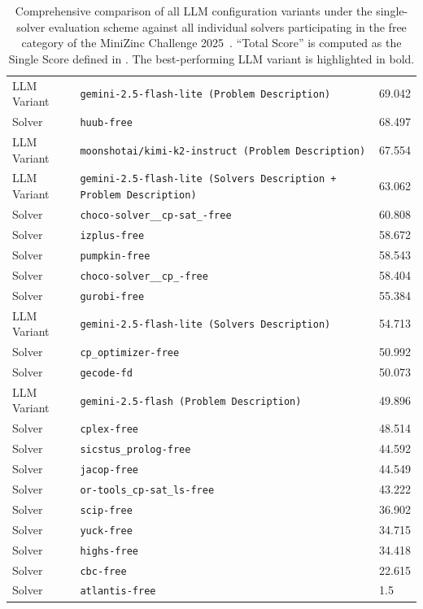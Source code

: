 \documentclass[../../main]{subfiles}
\begin{document}
\begin{table}[!ht]
{\begin{tabular}{lll}
            LLM Variant & \texttt{gemini-2.5-flash-lite (Problem Description)} & 69.042 \\
            Solver & \texttt{huub-free} & 68.497 \\
            LLM Variant & \texttt{moonshotai/kimi-k2-instruct (Problem Description)} & 67.554 \\
            LLM Variant & \texttt{gemini-2.5-flash-lite (Solvers Description + Problem Description)} & 63.062 \\
            Solver & \texttt{choco-solver\_\_cp-sat\_-free} & 60.808 \\
            Solver & \texttt{izplus-free} & 58.672 \\
            Solver & \texttt{pumpkin-free} & 58.543 \\
            Solver & \texttt{choco-solver\_\_cp\_-free} & 58.404 \\
            Solver & \texttt{gurobi-free} & 55.384 \\
            LLM Variant & \texttt{gemini-2.5-flash-lite (Solvers Description)} & 54.713 \\
            Solver & \texttt{cp\_optimizer-free} & 50.992 \\
            Solver & \texttt{gecode-fd} & 50.073 \\
            LLM Variant & \texttt{gemini-2.5-flash (Problem Description)} & 49.896 \\
            Solver & \texttt{cplex-free} & 48.514 \\
            Solver & \texttt{sicstus\_prolog-free} & 44.592 \\
            Solver & \texttt{jacop-free} & 44.549 \\
            Solver & \texttt{or-tools\_cp-sat\_ls-free} & 43.222 \\
            Solver & \texttt{scip-free} & 36.902 \\
            Solver & \texttt{yuck-free} & 34.715 \\
            Solver & \texttt{highs-free} & 34.418 \\
            Solver & \texttt{cbc-free} & 22.615 \\
            Solver & \texttt{atlantis-free} & 1.5 \\\hline
        \end{tabular}
    }
    \caption{Comprehensive comparison of all LLM configuration variants under the single-solver evaluation scheme against all individual solvers participating in the free category of the MiniZinc Challenge 2025~\cite{MznResults25}. ``Total Score'' is computed as the Single Score defined in . The best-performing LLM variant is highlighted in bold.}
    \label{tab:comparisanVarSin}
\end{table}
\end{document}
